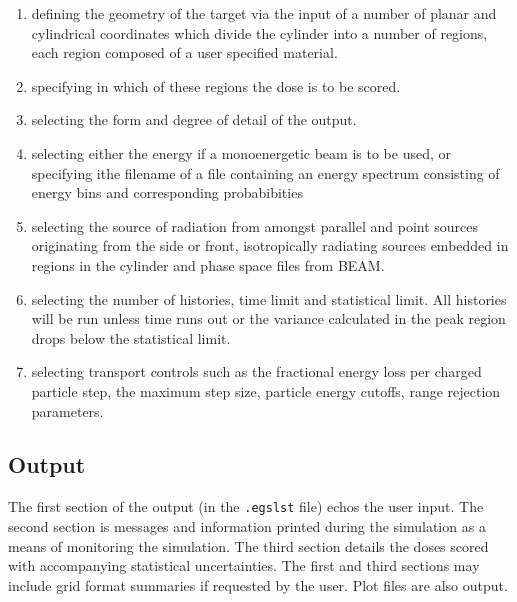 \documentclass[12pt,twoside]{article}  %
\begin{document}
\begin{enumerate}

\item{defining the geometry of the target via the input of a
number of planar and cylindrical coordinates which
divide the cylinder into a number of regions, each region
composed of a user specified material.}

\item{specifying in which of these regions the dose is to be
scored.}

\item{selecting the form and degree of detail of the output.}

\item{selecting either the energy if a monoenergetic beam is to be
used, or specifying ithe filename of a file containing
an energy spectrum consisting of
energy bins and corresponding probabibities}

\item{selecting the source of radiation from amongst parallel and
point sources originating from the side or front,
isotropically radiating sources embedded in regions
in the cylinder and phase space files from BEAM.}

\item{selecting the number of histories, time limit and statistical
limit. All histories will be run unless time runs out or
the variance calculated in the peak region drops below
the statistical limit.}

\item{selecting transport controls such as the fractional energy
loss per charged particle step, the maximum step size,
particle energy cutoffs, range rejection parameters.}

\end{enumerate}


\subsection{Output}

The first section of the output (in the {\tt .egslst} file) 
echos the user input.
The second section is messages and information printed
during the simulation as a means of monitoring the simulation.
The third section details the doses scored with
accompanying statistical uncertainties.
The first and third sections may include grid format summaries if
requested by the user. Plot files are also output.
\end{document}
